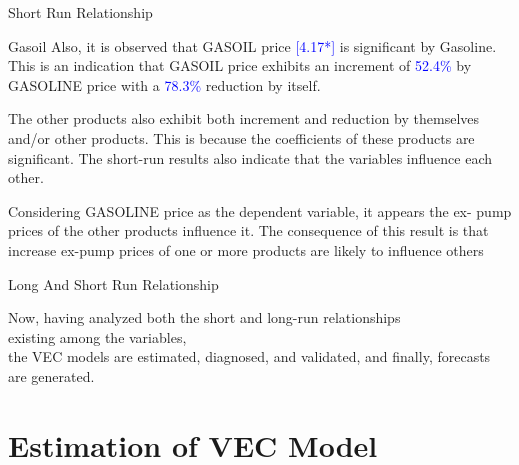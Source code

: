 \documentclass{beamer}
\newcommand{\colorPrimary}{blue}
\newcommand{\textPrimary}[1]{\textcolor{\colorPrimary}{#1}}
\newcommand{\vspaceTen}{\vspace{10pt}}
\begin{document}
	\begin{frame}{Short Run Relationship}
		
		\begin{block}{Gasoil}
			Also, it is observed that GASOIL price \textPrimary{[4.17*]} is significant by Gasoline. This is an indication that GASOIL price exhibits an increment of \textPrimary{52.4\%} by GASOLINE price with a \textPrimary{78.3\%} reduction by itself. 
		\end{block}
	
		\begin{block}{}
			The other products also exhibit both increment and reduction by themselves and/or other products. This is because the coefficients of these products are significant. The short-run results also indicate that the variables influence each other.
		\end{block}
		\begin{block}{}
			 Considering GASOLINE price as the dependent variable, it appears the ex- pump prices of the other products influence it. The consequence of this result is that increase ex-pump prices of one or more products are likely to influence others
		\end{block}
		
	\end{frame}
	
	\begin{frame}{Long And Short Run Relationship}
		\begin{block}{}
			\vspaceTen
			Now, having analyzed both the short and long-run relationships \\ existing among the variables, \\
			the VEC models are estimated, diagnosed, and validated, and
			finally, forecasts are generated.
			\vspaceTen
		\end{block}
	\end{frame}
	
	\section{Estimation of VEC Model}
	
\end{document}
